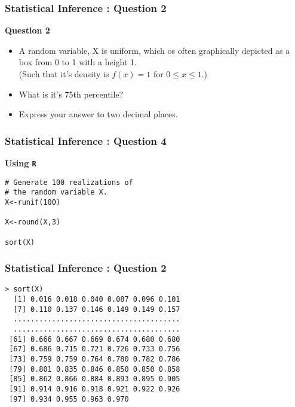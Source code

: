 \documentclass{beamer}
\begin{document}
\begin{frame}
\frametitle{Statistical Inference : Question 2}
\Large
\vspace{-1cm}
\textbf{Question 2}
\begin{itemize}
\item A random variable, X is uniform, which os often graphically depicted as a box from 0 to 1 with a height 1. \\(Such that it's density is $f(x)=1$ for $0\leq x\leq 1$.) 
\item What is it's 75th percentile?

\item Express your answer to two decimal places.

\end{itemize}
\end{frame}
\begin{frame}[fragile]
\frametitle{Statistical Inference : Question 4}
\Large

\vspace{-1cm}

\textbf{Using \texttt{R}}
\begin{framed}
\begin{verbatim}
# Generate 100 realizations of 
# the random variable X.
X<-runif(100)

X<-round(X,3)

sort(X)
\end{verbatim}
\end{framed}
\end{frame}
\begin{frame}[fragile]
\frametitle{Statistical Inference : Question 2}

\begin{framed}
\begin{verbatim}
> sort(X)
  [1] 0.016 0.018 0.040 0.087 0.096 0.101
  [7] 0.110 0.137 0.146 0.149 0.149 0.157
  .......................................
  .......................................
 [61] 0.666 0.667 0.669 0.674 0.680 0.680
 [67] 0.686 0.715 0.721 0.726 0.733 0.756
 [73] 0.759 0.759 0.764 0.780 0.782 0.786
 [79] 0.801 0.835 0.846 0.850 0.850 0.858
 [85] 0.862 0.866 0.884 0.893 0.895 0.905
 [91] 0.914 0.916 0.918 0.921 0.922 0.926
 [97] 0.934 0.955 0.963 0.970
\end{verbatim}
\end{framed}
\end{frame}
\end{document}

